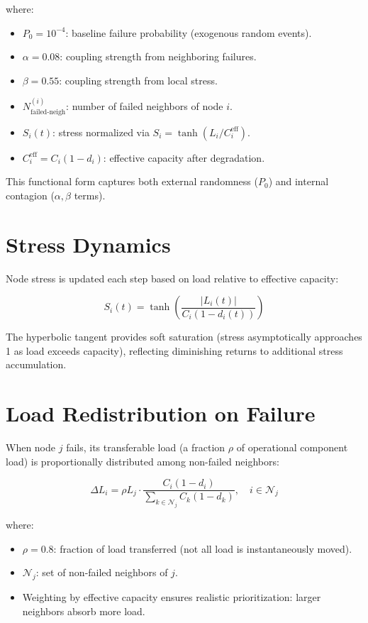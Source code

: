 \documentclass[12pt,a4paper,twoside]{report}
\begin{document}
where:
\begin{itemize}
\item $P_0 = 10^{-4}$: baseline failure probability (exogenous random events).
\item $\alpha = 0.08$: coupling strength from neighboring failures.
\item $\beta = 0.55$: coupling strength from local stress.
\item $N_{\text{failed-neigh}}^{(i)}$: number of failed neighbors of node $i$.
\item $S_i(t)$: stress normalized via $S_i = \tanh(L_i / C_i^{\text{eff}})$.
\item $C_i^{\text{eff}} = C_i(1 - d_i)$: effective capacity after degradation.
\end{itemize}

This functional form captures both external randomness ($P_0$) and internal contagion ($\alpha, \beta$ terms).

\section{Stress Dynamics}

Node stress is updated each step based on load relative to effective capacity:

\begin{equation}
S_i(t) = \tanh\left(\frac{|L_i(t)|}{C_i(1 - d_i(t))}\right)
\label{eq:stress}
\end{equation}

The hyperbolic tangent provides soft saturation (stress asymptotically approaches 1 as load exceeds capacity), reflecting diminishing returns to additional stress accumulation.

\section{Load Redistribution on Failure}

When node $j$ fails, its transferable load (a fraction $\rho$ of operational component load) is proportionally distributed among non-failed neighbors:

\begin{equation}
\Delta L_i = \rho L_j \cdot \frac{C_i(1-d_i)}{\sum_{k \in \mathcal{N}_j} C_k(1-d_k)}, \quad i \in \mathcal{N}_j
\label{eq:load_redist}
\end{equation}

where:
\begin{itemize}
\item $\rho = 0.8$: fraction of load transferred (not all load is instantaneously moved).
\item $\mathcal{N}_j$: set of non-failed neighbors of $j$.
\item Weighting by effective capacity ensures realistic prioritization: larger neighbors absorb more load.
\end{itemize}
\end{document}
